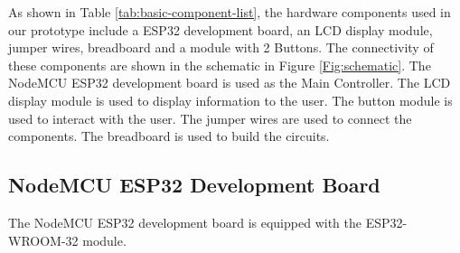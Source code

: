 As shown in Table \ref{tab:basic-component-list}, the hardware components used in our prototype include a ESP32 development board, an LCD display module, jumper wires, breadboard and a module with 2 Buttons. The connectivity of these components are shown in the schematic in Figure \ref{Fig:schematic}. The NodeMCU ESP32 development board is used as the Main Controller. The LCD display module is used to display information to the user. The button module is used to interact with the user. The jumper wires are used to connect the components. The breadboard is used to build the circuits.

\subsection{NodeMCU ESP32 Development Board}
The NodeMCU ESP32 development board is equipped with the ESP32-WROOM-32 module. 

